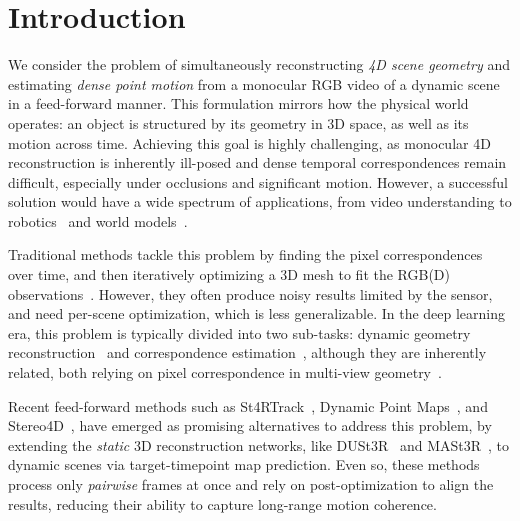 \section{Introduction}
\label{sec:intro}

We consider the problem of simultaneously reconstructing \emph{4D scene geometry}
and estimating \emph{dense point motion} from a monocular RGB video of a dynamic scene 
in a feed-forward manner.
This formulation mirrors how the physical world operates: an object is structured by its geometry in 3D space,
as well as its motion across time.
Achieving this goal is highly challenging, as monocular 4D reconstruction is inherently ill-posed and dense temporal correspondences remain difficult,
especially under occlusions and significant motion.
However, a successful solution would have a wide spectrum of applications,
from video understanding to robotics~\cite{wang2017deepvo,qin2018vins} and world models~\cite{ha2018world, hafner2025mastering}.

Traditional methods tackle this problem by finding the pixel correspondences over time,
and then iteratively optimizing a 3D mesh to fit the RGB(D) observations~\cite{zollhofer2014real,newcombe2015dynamicfusion,innmann2016volumedeform}.
However, they often produce noisy results limited by the sensor,
and need per-scene optimization, which is less generalizable.
In the deep learning era, this problem is typically divided into two sub-tasks:
dynamic geometry reconstruction~\cite{zhang24monst3r,wang2025continuous,jiang2025geo4d}
and correspondence estimation~\cite{teed2020raft,karaev2024cotracker}, although they are inherently related, both relying on pixel correspondence in multi-view geometry~\cite{hartley2003multiple}.

Recent feed-forward methods such as St4RTrack~\cite{st4rtrack2025},
Dynamic Point Maps~\cite{sucar2025dynamic},
and Stereo4D~\cite{jin2024stereo4d},
have emerged as promising alternatives to address this problem,
by extending the \emph{static} 3D reconstruction networks,
like DUSt3R~\cite{wang2024dust3r} and MASt3R~\cite{leroy2024grounding},
to dynamic scenes via target-timepoint map prediction.
Even so, these methods process only \emph{pairwise} frames at once and rely on post-optimization to align the results,
reducing their ability to capture long-range motion coherence.

